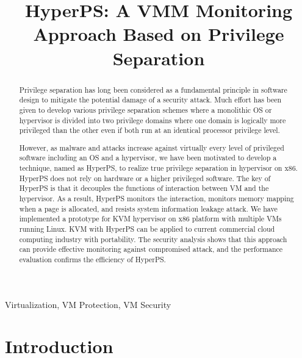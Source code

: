 \documentclass[conference]{IEEEtran}
\begin{document}
\title{HyperPS: A VMM Monitoring Approach Based on Privilege Separation}
\iffalse
\author{\IEEEauthorblockN{Wenqing Liu,Kunli Lin,Song Wei,Kun Zhang,Bibo Tu}
\IEEEauthorblockA{\textit{Institute of Information Engineering, Chinese Academy of Sciences} \\
\textit{School of Cyber Security, University of Chinese Academy of Sciences}\\
\{liuwenqing,linkunli,zhangkun,tubibo\}@iie.ac.cn}
}
\fi
\maketitle

\begin{abstract}

Privilege separation has long been considered as a fundamental principle in software design to mitigate the potential damage of a security attack. Much effort has been given to develop various privilege separation schemes where a monolithic OS or hypervisor is divided into two privilege domains where one domain is logically more privileged than the other even if both run at an identical processor privilege level.

However, as malware and attacks increase against virtually every level of privileged software including
an OS and a hypervisor, we have been motivated to develop a technique, named as HyperPS, to realize true privilege separation in hypervisor on x86. HyperPS does not rely on hardware or a higher privileged software. 
The key of HyperPS is that it decouples the functions of interaction between VM and the hypervisor. As a result, HyperPS monitors the interaction, monitors memory mapping when a page is allocated, and resists system information leakage attack.
We have implemented a prototype for KVM hypervisor on x86 platform with multiple VMs running Linux. KVM with HyperPS can be applied to current commercial cloud computing industry with portability. The security analysis shows that this approach can provide effective monitoring against compromised attack, and the performance evaluation confirms the efficiency of HyperPS.
\end{abstract}

\begin{IEEEkeywords}
Virtualization, VM Protection, VM Security
\end{IEEEkeywords}

\section{Introduction}
\end{document}

